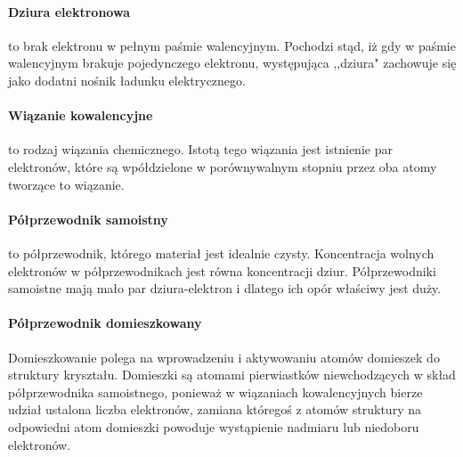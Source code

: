 \documentclass{article}
\begin{document}
            \paragraph{Dziura elektronowa}
            to brak elektronu w pełnym paśmie walencyjnym.
            Pochodzi stąd, iż gdy w paśmie walencyjnym brakuje pojedynczego
            elektronu, występująca ,,dziura" zachowuje się jako dodatni
            nośnik ładunku elektrycznego. 

            \paragraph{Wiązanie kowalencyjne}
            to rodzaj wiązania chemicznego. Istotą tego wiązania jest
            istnienie par elektronów, które są wpółdzielone w porównywalnym
            stopniu przez oba atomy tworzące to wiązanie.

            \paragraph{Półprzewodnik samoistny}
            to półprzewodnik, którego materiał jest idealnie czysty.
            Koncentracja wolnych elektronów w półprzewodnikach jest równa
            koncentracji dziur. Półprzewodniki samoistne mają mało par
            dziura-elektron i dlatego ich opór właściwy jest duży.

            \paragraph{Półprzewodnik domieszkowany}
            Domieszkowanie polega na wprowadzeniu i aktywowaniu atomów
            domieszek do struktury kryształu. Domieszki są atomami pierwiastków
            niewchodzących w skład półprzewodnika samoistnego, ponieważ
            w wiązaniach kowalencyjnych bierze udział ustalona liczba elektronów,
            zamiana któregoś z atomów struktury na odpowiedni atom domieszki
            powoduje wystąpienie nadmiaru lub niedoboru elektronów.


            \
            
\end{document}
